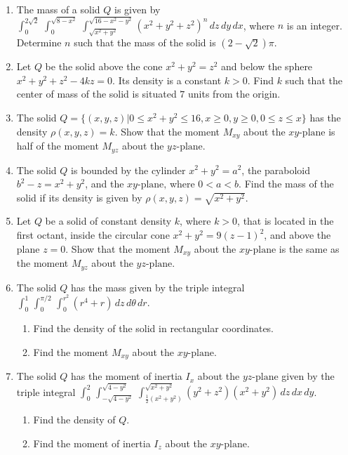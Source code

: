 \documentclass{exercises}
\begin{document}
\begin{enumerate}[resume]
\item The mass of a solid $Q$ is given by $\int_{0}^{2\sqrt{2}}\,\int_{0}^{\sqrt{8-x^{2}}}\,\int_{\sqrt{x^{2}+y^{2}}}^{\sqrt{16-x^{2}-y^{2}}}{(x^{2}+y^{2}+z^{2})}^{n}\,dz\,dy\,dx$, where $n$ is an integer. Determine $n$ such that the mass of the solid is $(2-\sqrt{2})\pi$.
\item Let $Q$ be the solid above the cone $x^{2}+y^{2}=z^{2}$ and below the sphere $x^{2}+y^{2}+z^{2}-4kz=0$. Its density is a constant $k>0$. Find $k$ such that the center of mass of the solid is situated $7$ units from the origin.
\item The solid $Q=\{(x,y,z)|0\le x^{2}+y^{2}\le16,x\ge0,y\ge0,0\le z\le x\}$ has the density $\rho(x,y,z)=k$. Show that the moment $M_{xy}$ about the $xy\text{-plane}$ is half of the moment $M_{yz}$ about the $yz\text{-plane}$.
\item The solid $Q$ is bounded by the cylinder $x^{2}+y^{2}=a^{2}$, the paraboloid $b^{2}-z=x^{2}+y^{2}$, and the $xy\text{-plane,}$ where $0<a<b$. Find the mass of the solid if its density is given by $\rho(x,y,z)=\sqrt{x^{2}+y^{2}}$.
\item Let $Q$ be a solid of constant density $k$, where $k>0$, that is located in the first octant, inside the circular cone $x^{2}+y^{2}=9{(z-1)}^{2}$, and above the plane $z=0$. Show that the moment $M_{xy}$ about the $xy\text{-plane}$ is the same as the moment $M_{yz}$ about the $yz\text{-plane}$.
\item The solid $Q$ has the mass given by the triple integral $\int_{0}^{1}\,\int_{0}^{\pi/2}\,\int_{0}^{r^{2}}(r^{4}+r)\,dz\,d\theta \,dr$.
\begin{enumerate}[label=(\alph*)]
  \item Find the density of the solid in rectangular coordinates.
  \item Find the moment $M_{xy}$ about the $xy\text{-plane}$.
\end{enumerate}
\item The solid $Q$ has the moment of inertia $I_{x}$ about the $yz\text{-plane}$ given by the triple integral $\int_{0}^{2}\,\int_{-\sqrt{4-y^{2}}}^{\sqrt{4-y^{2}}}\,\int_{\frac{1}{2}(x^{2}+y^{2})}^{\sqrt{x^{2}+y^{2}}}(y^{2}+z^{2})(x^{2}+y^{2})\,dz\,dx\,dy$.
\begin{enumerate}[label=(\alph*)]
  \item Find the density of $Q$.
  \item Find the moment of inertia $I_{z}$ about the $xy\text{-plane.}$
\end{enumerate}

\end{enumerate}
\end{document}

